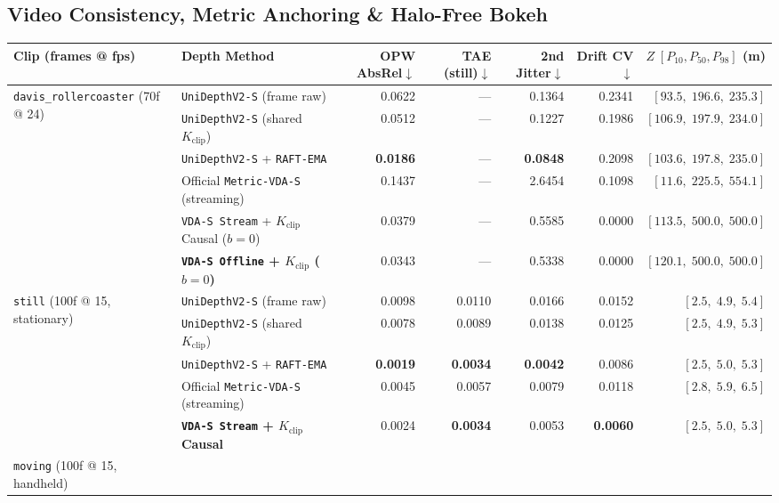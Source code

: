 \documentclass[10pt,twocolumn,letterpaper]{article}
\begin{document}
\subsection{Video Consistency, Metric Anchoring \& Halo-Free Bokeh}
\begin{table}[t]
\centering
\scriptsize
\setlength{\tabcolsep}{4.0pt}
\begin{tabular}{@{}llrrrrr@{}}
\toprule
Clip (frames @ fps) & Depth Method & OPW AbsRel$\downarrow$ & TAE (still)$\downarrow$ & 2nd Jitter$\downarrow$ & Drift CV$\downarrow$ & $Z\;[P_{10}, P_{50}, P_{98}]$ (m) \\
\midrule
\multirow{6}{*}{\texttt{davis\_rollercoaster} (70f @ 24)}
 & \texttt{UniDepthV2-S} (frame raw)            & 0.0622 & --- & 0.1364 & 0.2341 & $[93.5,\; 196.6,\; 235.3]$ \\
 & \texttt{UniDepthV2-S} (shared $K_{\text{clip}}$) & 0.0512 & --- & 0.1227 & 0.1986 & $[106.9,\; 197.9,\; 234.0]$ \\
 & \texttt{UniDepthV2-S} + \texttt{RAFT-EMA}     & \textbf{0.0186} & --- & \textbf{0.0848} & 0.2098 & $[103.6,\; 197.8,\; 235.0]$ \\
 & Official \texttt{Metric-VDA-S} (streaming)    & 0.1437 & --- & 2.6454 & 0.1098 & $[11.6,\; 225.5,\; 554.1]$ \\
 & \texttt{VDA-S Stream} + $K_{\text{clip}}$ Causal ($b=0$) & 0.0379 & --- & 0.5585 & 0.0000 & $[113.5,\; 500.0,\; 500.0]$ \\
 & \textbf{\texttt{VDA-S Offline} + $K_{\text{clip}}$ ($b=0$)} & 0.0343 & --- & 0.5338 & 0.0000 & $[120.1,\; 500.0,\; 500.0]$ \\
\midrule
\multirow{5}{*}{\texttt{still} (100f @ 15, stationary)}
 & \texttt{UniDepthV2-S} (frame raw)            & 0.0098 & 0.0110 & 0.0166 & 0.0152 & $[2.5,\; 4.9,\; 5.4]$ \\
 & \texttt{UniDepthV2-S} (shared $K_{\text{clip}}$) & 0.0078 & 0.0089 & 0.0138 & 0.0125 & $[2.5,\; 4.9,\; 5.3]$ \\
 & \texttt{UniDepthV2-S} + \texttt{RAFT-EMA}     & \textbf{0.0019} & \textbf{0.0034} & \textbf{0.0042} & 0.0086 & $[2.5,\; 5.0,\; 5.3]$ \\
 & Official \texttt{Metric-VDA-S} (streaming)    & 0.0045 & 0.0057 & 0.0079 & 0.0118 & $[2.8,\; 5.9,\; 6.5]$ \\
 & \textbf{\texttt{VDA-S Stream} + $K_{\text{clip}}$ Causal} & 0.0024 & \textbf{0.0034} & 0.0053 & \textbf{0.0060} & $[2.5,\; 5.0,\; 5.3]$ \\
\midrule
\multirow{5}{*}{\texttt{moving} (100f @ 15, handheld)}

\end{tabular}
\end{table}
\end{document}
